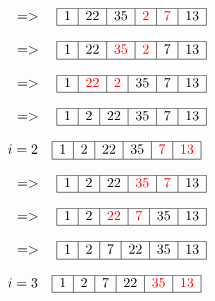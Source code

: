 \documentclass{article}
\begin{document}
\[
    \quad => \quad
\begin{array}{|c|c|c|c|c|c|}
\hline
1 & 22 & 35 & \textcolor{red}{2} & \textcolor{red}{7} & 13 \\ 
\hline
\end{array}
\]

\[
    \quad => \quad
\begin{array}{|c|c|c|c|c|c|}
\hline
1 & 22 & \textcolor{red}{35} & \textcolor{red}{2} & 7 & 13 \\ 
\hline
\end{array}
\]

\[
    \quad => \quad
\begin{array}{|c|c|c|c|c|c|}
\hline
1 & \textcolor{red}{22} & \textcolor{red}{2} & 35 & 7 & 13 \\ 
\hline
\end{array}
\]

\[
    \quad => \quad
\begin{array}{|c|c|c|c|c|c|}
\hline
1 & 2 & 22 & 35 & 7 & 13 \\ 
\hline
\end{array}
\]

\[
i = 2 \quad
\begin{array}{|c|c|c|c|c|c|}
\hline
1 & 2 & 22 & 35 & \textcolor{red}{7} & \textcolor{red}{13} \\ 
\hline
\end{array}
\]

\[
    \quad => \quad
\begin{array}{|c|c|c|c|c|c|}
\hline
1 & 2 & 22 & \textcolor{red}{35} & \textcolor{red}{7} & 13 \\ 
\hline
\end{array}
\]

\[
    \quad => \quad
\begin{array}{|c|c|c|c|c|c|}
\hline
1 & 2 & \textcolor{red}{22} & \textcolor{red}{7} & 35 & 13 \\ 
\hline
\end{array}
\]

\[
    \quad => \quad
\begin{array}{|c|c|c|c|c|c|}
\hline
1 & 2 & 7 & 22 & 35 & 13 \\ 
\hline
\end{array}
\]

\[
i = 3 \quad
\begin{array}{|c|c|c|c|c|c|}
\hline
1 & 2 & 7 & 22 & \textcolor{red}{35} & \textcolor{red}{13} \\ 
\hline
\end{array}
\]
\end{document}
